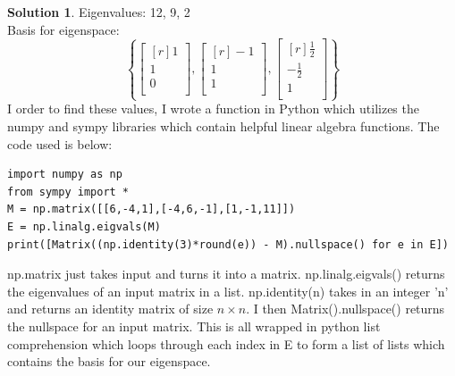 \documentclass[12pt]{article}
\theoremstyle{definition}
\newtheorem*{solution}{Solution} %
\theoremstyle{plain}
\begin{document}
\begin{enumerate}
\begin{solution}
Eigenvalues: 12, 9, 2\\
Basis for eigenspace:  
\[ \left\{ \begin{bmatrix}[r]1\\1\\0\\\end{bmatrix},\begin{bmatrix}[r]-1\\1\\1\\\end{bmatrix},\begin{bmatrix}[r]\frac{1}{2}\\-\frac{1}{2}\\1\\\end{bmatrix} \right\} \]
I order to find these values, I wrote a function in Python which utilizes the numpy and sympy libraries which contain helpful linear algebra functions. The code used is below:
\begin{verbatim}
import numpy as np
from sympy import *
M = np.matrix([[6,-4,1],[-4,6,-1],[1,-1,11]])
E = np.linalg.eigvals(M)
print([Matrix((np.identity(3)*round(e)) - M).nullspace() for e in E])
\end{verbatim}
np.matrix just takes input and turns it into a matrix. np.linalg.eigvals() returns the eigenvalues of an input matrix in a list. np.identity(n) takes in an integer 'n' and returns an identity matrix of size $n\times n$. I then Matrix().nullspace() returns the nullspace for an input matrix. This is all wrapped in python list comprehension which loops through each index in E to form a list of lists which contains the basis for our eigenspace.
\end{solution}


\end{enumerate}
\end{document}
